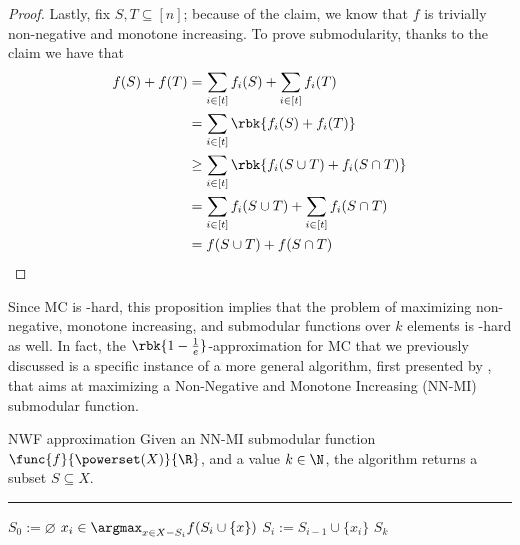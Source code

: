 \documentclass[a4paper, 12pt]{report}
\begin{document}
\begin{proof}
        Lastly, fix $S, T \subseteq [n]$; because of the claim, we know that $f$ is trivially non-negative and monotone increasing. To prove submodularity, thanks to the claim we have that
        \begin{equation*}
            \begin{split}
                f(S) + f(T) &= \sum_{i \in [t]}{f_i(S)} + \sum_{i \in [t]}{f_i(T)} \\
                            &= \sum_{i \in [t]}{\rbk{f_i(S) + f_i(T)}} \\
                            &\ge \sum_{i \in [t]}{\rbk{f_i(S \cup T) + f_i(S \cap T)}} \\
                            &= \sum_{i \in [t]}{f_i(S \cup T)} + \sum_{i \in [t]}{f_i(S \cap T)} \\
                            &= f(S \cup T) + f(S \cap T)
            \end{split}
        \end{equation*}
    \end{proof}

    Since MC is \NPclass-hard, this proposition implies that the problem of maximizing non-negative, monotone increasing, and submodular functions over $k$ elements is \NPclass-hard as well. In fact, the $\rbk{1 - \tfrac{1}{e}}$-approximation for MC that we previously discussed is a specific instance of a more general algorithm, first presented by \textcite{nwf}, that aims at maximizing a Non-Negative and Monotone Increasing (NN-MI) submodular function.

    \begin{framedalgo}[label={nwf approx}]{NWF approximation}
        Given an NN-MI submodular function $\func{f}{\powerset(X)}{\R}$, and a value $k \in \N$, the algorithm returns a subset $S \subseteq X$. \\
        \hrule

        \quad
        \begin{algorithmic}[1]
                \State $S_0 := \varnothing$
                    \State $\displaystyle x_i \in \argmax_{x \in X - S_i}{f(S_i \cup \{x\})}$ 
                    \State $S_i := S_{i - 1} \cup \{x_i\}$
                \EndFor
                \State {} $S_k$
            \EndFunction
        \end{algorithmic}
    \end{framedalgo}
\end{document}
